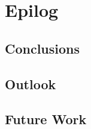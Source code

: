 \chapter{Epilog}
\label{ch:conclusion}

\section{Conclusions}

\section{Outlook}

\section{Future Work}
